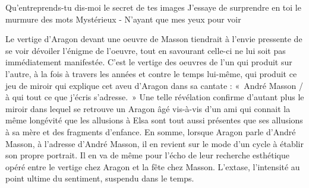 Qu’entreprends-tu dis-moi le secret de tes images
J’essaye de surprendre en toi le murmure des mots
Mystérieux - N’ayant que mes yeux pour voir

	Le vertige d’Aragon devant une oeuvre de Masson tiendrait à l’envie pressente de se voir dévoiler l’énigme de l’oeuvre, tout en savourant celle-ci ne lui soit pas immédiatement manifestée. C’est le vertige des oeuvres de l’un qui produit sur l’autre, à la fois à travers les années et contre le temps lui-même, qui produit ce jeu de miroir qui explique cet aveu d’Aragon dans sa cantate : « André Masson / à qui tout ce que j’écris s’adresse. »  Une telle révélation confirme d’autant plus le miroir dans lequel se retrouve un Aragon âgé vis-à-vis d’un ami qui connait la même longévité que les allusions à Elsa sont tout aussi présentes que ses allusions à sa mère et des fragments d’enfance. En somme, lorsque Aragon parle d’André Masson, à l’adresse d’André Masson, il en revient sur le mode d’un cycle à établir son propre portrait. Il en va de même pour l’écho de leur recherche esthétique opéré entre le vertige chez Aragon et la fête chez Masson. L’extase, l’intensité au point ultime du sentiment, suspendu dans le temps. 

    

